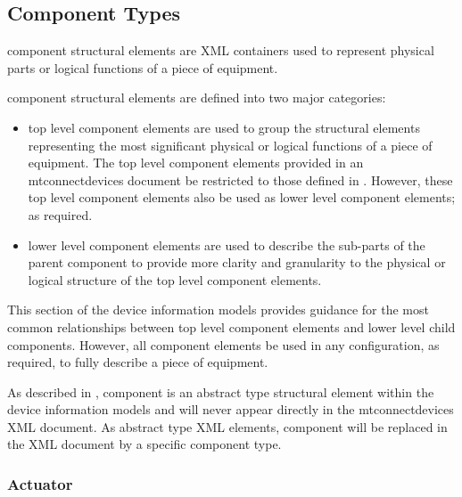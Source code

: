 \subsection{Component Types} \label{sec:ComponentTypes}

\gls{component} \glspl{structural element} are XML containers used to represent physical parts or logical functions of a piece of equipment.

\gls{component} \glspl{structural element} are defined into two major categories:

\begin{itemize}

\item \gls{top level} \gls{component} elements are used to group the \glspl{structural element} representing the most significant physical or logical functions of a piece of equipment.  The \gls{top level} \gls{component} elements provided in an \gls{mtconnectdevices} document \should be restricted to those defined in .  However, these \gls{top level} \gls{component} elements \may also be used as \gls{lower level} \gls{component} elements; as required.

\item \gls{lower level} \gls{component} elements are used to describe the sub-parts of the parent \gls{component} to provide more clarity and granularity to the physical or logical structure of the \gls{top level} \gls{component} elements.
\end{itemize}

This section of the \glspl{device information model} provides guidance for the most common relationships between \gls{top level} \gls{component} elements and \gls{lower level} child components.  However, all \gls{component} elements \may be used in any configuration, as required, to fully describe a piece of equipment.

As described in , \gls{component} is an abstract type \gls{structural element} within the \glspl{device information model} and will never appear directly in the \gls{mtconnectdevices} XML document.  As abstract type XML elements, \gls{component} will be replaced in the XML document by a specific \gls{component} type.


\subsubsection{Actuator}
  \label{sec:Actuator}


